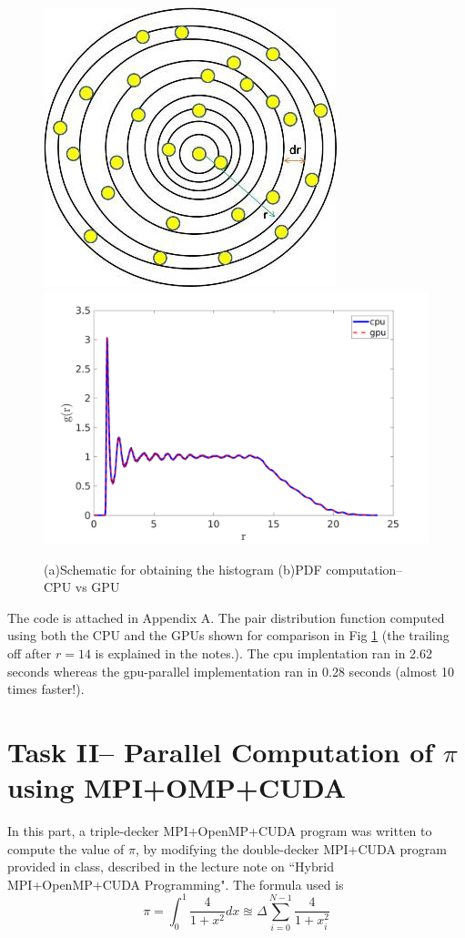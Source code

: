 \documentclass[11pt, oneside]{article}   	%
\begin{document}
\begin{figure}[!htbp] \label{fig:pdf}
	\centering
	\includegraphics[scale=0.87]{pdf_pic.jpg}
	\includegraphics[scale=0.31]{pdf_cpuVsgpu.png}
	\caption{(a)Schematic for obtaining the histogram (b)PDF computation-- CPU vs GPU}
\end{figure}

The code is attached in Appendix A. The pair distribution function computed using both the CPU and the GPUs shown for comparison in Fig \ref{fig:pdf} (the trailing off after $r=14$ is explained in the notes.). The cpu implentation ran in 2.62 seconds whereas the gpu-parallel implementation ran in 0.28 seconds (almost 10 times faster!).



\vspace{-2ex}
\section{Task II-- Parallel Computation of $\pi$ using MPI+OMP+CUDA}
In this part, a triple-decker MPI+OpenMP+CUDA program was written to compute the value of $\pi$, by modifying the double-decker MPI+CUDA program provided in class, described in the lecture note on ``Hybrid MPI+OpenMP+CUDA Programming". The formula used is
	\begin{equation}
		\pi = \int_{0}^{1} \frac{4}{1+x^2} dx \approxeq \Delta \sum_{i=0}^{N-1} \frac{4}{1+x_i^2}
	\end{equation}
\end{document}

